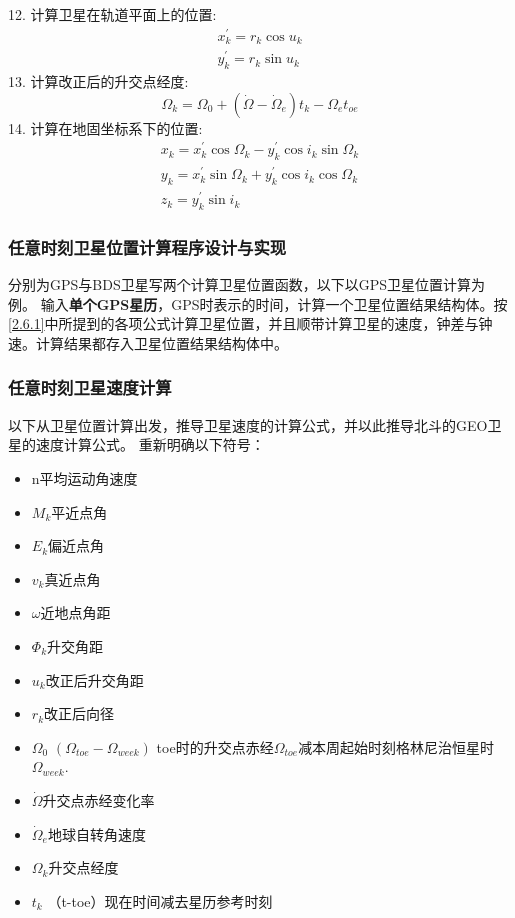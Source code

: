 \documentclass{ctexart}
\begin{document}
12. 计算卫星在轨道平面上的位置:
\begin{equation}
\begin{gathered}
x_{k}^{\prime}=r_{k} \cos u_{k} \\
y_{k}^{\prime}=r_{k} \sin u_{k}
\label{eq:21}
\end{gathered}
\end{equation}
13. 计算改正后的升交点经度:
\begin{equation}
\Omega_{k}=\Omega_{0}+\left(\dot{\Omega}-\dot{\Omega}_{e}\right) t_{k}-\Omega_{e} t_{oe}
\label{eq:22}
\end{equation}
14. 计算在地固坐标系下的位置:
\begin{equation}
\begin{gathered}
x_{k}=x_{k}^{\prime} \cos \Omega_{k}-y_{k}^{\prime} \cos i_{k} \sin \Omega_{k} \\
y_{k}=x_{k}^{\prime} \sin \Omega_{k}+y_{k}^{\prime} \cos i_{k} \cos \Omega_{k} \\
z_{k}=y_{k}^{\prime} \sin i_{k}
\label{eq:23}
\end{gathered}
\end{equation}

\subsubsection{任意时刻卫星位置计算程序设计与实现}
分别为GPS与BDS卫星写两个计算卫星位置函数，以下以GPS卫星位置计算为例。
输入\textbf{单个GPS星历}，GPS时表示的时间，计算一个卫星位置结果结构体。按\ref{2.6.1}中所提到的各项公式计算卫星位置，并且顺带计算卫星的速度，钟差与钟速。计算结果都存入卫星位置结果结构体中。

\subsubsection{任意时刻卫星速度计算}
以下从卫星位置计算出发，推导卫星速度的计算公式，并以此推导北斗的GEO卫星的速度计算公式。
重新明确以下符号：
\begin{itemize}
\item n平均运动角速度
\item $M_k$平近点角
\item $E_k$偏近点角
\item $v_k$真近点角
\item $\omega$近地点角距
\item $\Phi_k$升交角距
\item $u_k$改正后升交角距
\item $r_k$改正后向径
\item $\Omega_0$ \hspace{0.4cm}$(\Omega_{toe}-\Omega_{week})$  toe时的升交点赤经$\Omega_{toe}$减本周起始时刻格林尼治恒星时$\Omega_{week}$.
\item $\dot{\Omega}$升交点赤经变化率
\item $\dot{\Omega}_e$地球自转角速度
\item $\Omega_k$升交点经度
\item $t_k$  （t-toe）现在时间减去星历参考时刻
\end{itemize}
\end{document}
